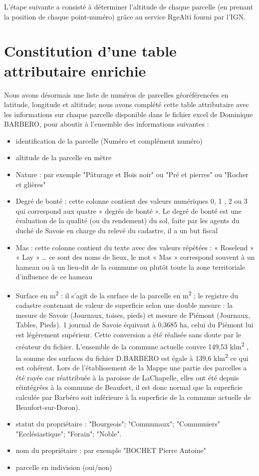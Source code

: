 \documentclass[12pt,a4paper]{report}
\begin{document}
\medskip

L'étape suivante a consisté à déterminer l'altitude de chaque parcelle (en prenant la position de chaque point-numéro) grâce au service RgeAlti fourni par l'IGN.
	


\section{Constitution d'une table attributaire enrichie}

Nous avons désormais une liste de numéros de parcelles géoréférencées en latitude, longitude et altitude; nous avons complété cette table attributaire avec les informations sur chaque parcelle disponible dans le fichier excel de Dominique BARBERO, pour aboutir à l'ensemble des informations suivantes :
\begin{itemize}
	\item identification de la parcelle (Numéro et complément numéro)
	\item altitude de la parcelle en mètre
	\item Nature : par exemple "Pâturage et Bois noir" ou "Pré et pierres" ou "Rocher et glières"
	\item Degré de bonté : cette colonne contient des valeurs numériques 0, 1 , 2 ou 3 qui correspond aux quatre « degrés de bonté ». Le degré de bonté est une évaluation de la qualité (ou du rendement) du sol, faite par les agents du duché de Savoie en charge du relevé du cadastre, il a un but fiscal
	\item Mas : cette colonne contient du texte avec des valeurs répétées : « Roselend » « Lay » … ce sont des noms de lieux, le mot « Mas » correspond souvent à un hameau ou à un lieu-dit de la commune ou plutôt toute la zone territoriale d’influence de ce hameau
	\item Surface en m\textsuperscript{2} : il s’agit de la surface de la parcelle en m\textsuperscript{2} ; le registre du cadastre contenant de valeur de superficie selon une double mesure : la mesure de Savoie (Journaux, toises, pieds) et mesure de Piémont (Journaux, Tables, Pieds). 1 journal de Savoie équivaut à 0,3685 ha, celui du Piémont lui est légèrement supérieur. Cette conversion a été réalisée sans doute par le créateur du fichier. L’ensemble de la commune actuelle couvre 149,53 klm\textsuperscript{2} , la somme des surfaces du fichier D.BARBERO est égale à 139,6 klm\textsuperscript{2} ce qui est cohérent. Lors  de l'établissement de la Mappe une partie des parcelles a été rayée car réattribuée à la paroisse de LaChapelle, elles ont été depuis réintégrées à la commune de Beaufort, il est donc normal que la superficie calculée par Barbéro soit inférieure à la superficie de la commune actuelle de Beaufort-sur-Doron). 
	\item statut du propriétaire : "Bourgeois"; "Communaux"; "Communiers" "Ecclésiastique"; "Forain"; "Noble".
	\item nom du propriétaire : par exemple "BOCHET Pierre Antoine"
	\item parcelle en indivision (oui/non)
	

\end{itemize}
\end{document}
